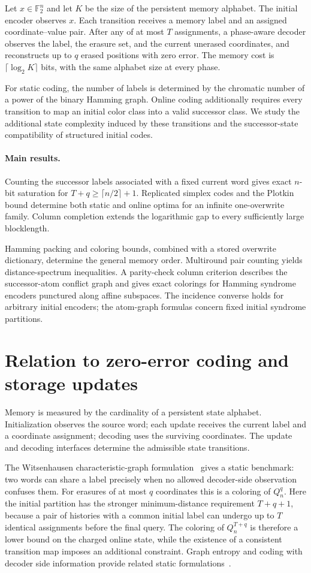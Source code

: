 \documentclass[11pt,a4paper]{article}
\begin{document}
Let $x\in\mathbb F_2^n$ and let $K$ be the size of the persistent memory alphabet. The initial encoder observes $x$. Each transition receives a memory label and an assigned coordinate--value pair. After any of at most $T$ assignments, a phase-aware decoder observes the label, the erasure set, and the current unerased coordinates, and reconstructs up to $q$ erased positions with zero error. The memory cost is $\lceil\log_2 K\rceil$ bits, with the same alphabet size at every phase.

For static coding, the number of labels is determined by the chromatic number of a power of the binary Hamming graph. Online coding additionally requires every transition to map an initial color class into a valid successor class. We study the additional state complexity induced by these transitions and the successor-state compatibility of structured initial codes.

\paragraph{Main results.}
Counting the successor labels associated with a fixed current word gives exact $n$-bit saturation for $T+q\ge\lceil n/2\rceil+1$. Replicated simplex codes and the Plotkin bound determine both static and online optima for an infinite one-overwrite family. Column completion extends the logarithmic gap to every sufficiently large blocklength.

Hamming packing and coloring bounds, combined with a stored overwrite dictionary, determine the general memory order. Multiround pair counting yields distance-spectrum inequalities. A parity-check column criterion describes the successor-atom conflict graph and gives exact colorings for Hamming syndrome encoders punctured along affine subspaces. The incidence converse holds for arbitrary initial encoders; the atom-graph formulas concern fixed initial syndrome partitions.
\section{Relation to zero-error coding and storage updates}\label{sec:related}
Memory is measured by the cardinality of a persistent state alphabet. Initialization observes the source word; each update receives the current label and a coordinate assignment; decoding uses the surviving coordinates. The update and decoding interfaces determine the admissible state transitions.

The Witsenhausen characteristic-graph formulation~\cite{witsenhausen1976} gives a static benchmark: two words can share a label precisely when no allowed decoder-side observation confuses them. For erasures of at most $q$ coordinates this is a coloring of $Q_n^q$. Here the initial partition has the stronger minimum-distance requirement $T+q+1$, because a pair of histories with a common initial label can undergo up to $T$ identical assignments before the final query. The coloring of $Q_n^{T+q}$ is therefore a lower bound on the charged online state, while the existence of a consistent transition map imposes an additional constraint. Graph entropy and coding with decoder side information provide related static formulations~\cite{koulgi2003,orlitsky2001,bakshi2010}.
\end{document}
